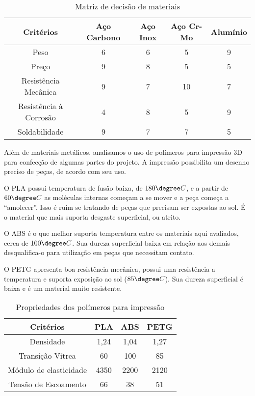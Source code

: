 \begin{table}[H]
\centering
\caption{Matriz de decisão de materiais}
\begin{tabular}{|c|c|c|c|c|}
\hline
\textbf{Critérios}      & \textbf{Aço Carbono} & \textbf{Aço Inox} & \textbf{Aço Cr-Mo} & \textbf{Alumínio} \\ \hline
Peso                               & 6                    & 6                 & 5                  & 9                 \\ \hline
Preço                              & 9                    & 8                 & 5                  & 5                 \\ \hline
Resistência  Mecânica               & 9                    & 7                 & 10                 & 7                 \\ \hline
Resistência à Corrosão              & 4                    & 8                 & 5                  & 9                 \\ \hline
Soldabilidade                       & 9                    & 7                 & 7                  & 5                 \\ \hline
\end{tabular}
\end{table}

	Além de materiais metálicos, analisamos o uso de polímeros para impressão 3D para confecção de algumas partes do projeto. A impressão possibilita um desenho preciso de peças, de acordo com seu uso.
	
	O PLA possui temperatura de fusão baixa, de $180 \degree C$, e a partir de $60 \degree C$ as moléculas internas começam a se mover e a peça começa a “amolecer”. Isso é ruim se tratando de peças que precisam ser expostas ao sol. É o material que mais suporta desgaste superficial, ou atrito.

	O ABS é o que melhor suporta temperatura entre os materiais aqui avaliados, cerca de $100 \degree C$. Sua dureza superficial baixa em relação aos demais desqualifica-o para utilização em peças que necessitam contato.

 O PETG apresenta boa resistência mecânica, possui uma resistência a temperatura e suporta exposição ao sol ($85 \degree C$). Sua dureza superficial é baixa e é um material muito resistente.
 
 \begin{table}[H]
\centering
\caption{Propriedades dos polímeros para impressão}
\begin{tabular}{|c|c|c|c|}
\hline
\textbf{Critérios}     & \textbf{PLA} & \textbf{ABS} & \textbf{PETG} \\ \hline
Densidade              & 1,24         & 1,04         & 1,27          \\ \hline
Transição Vítrea       & 60           & 100          & 85            \\ \hline
Módulo de elasticidade & 4350         & 2200         & 2120          \\ \hline
Tensão de Escoamento   & 66           & 38           & 51            \\ \hline
\end{tabular}
\end{table}
	
